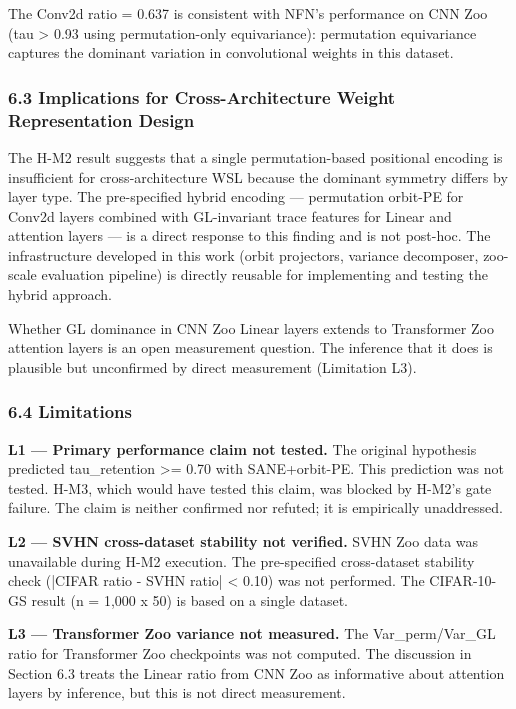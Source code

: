 The Conv2d ratio = 0.637 is consistent with NFN's performance on CNN Zoo (tau > 0.93 using permutation-only equivariance): permutation equivariance captures the dominant variation in convolutional weights in this dataset.

\subsubsection{6.3 Implications for Cross-Architecture Weight Representation Design}

The H-M2 result suggests that a single permutation-based positional encoding is insufficient for cross-architecture WSL because the dominant symmetry differs by layer type. The pre-specified hybrid encoding — permutation orbit-PE for Conv2d layers combined with GL-invariant trace features for Linear and attention layers — is a direct response to this finding and is not post-hoc. The infrastructure developed in this work (orbit projectors, variance decomposer, zoo-scale evaluation pipeline) is directly reusable for implementing and testing the hybrid approach.

Whether GL dominance in CNN Zoo Linear layers extends to Transformer Zoo attention layers is an open measurement question. The inference that it does is plausible but unconfirmed by direct measurement (Limitation L3).

\subsubsection{6.4 Limitations}

\textbf{L1 — Primary performance claim not tested.} The original hypothesis predicted tau_retention >= 0.70 with SANE+orbit-PE. This prediction was not tested. H-M3, which would have tested this claim, was blocked by H-M2's gate failure. The claim is neither confirmed nor refuted; it is empirically unaddressed.

\textbf{L2 — SVHN cross-dataset stability not verified.} SVHN Zoo data was unavailable during H-M2 execution. The pre-specified cross-dataset stability check (|CIFAR ratio - SVHN ratio| < 0.10) was not performed. The CIFAR-10-GS result (n = 1,000 x 50) is based on a single dataset.

\textbf{L3 — Transformer Zoo variance not measured.} The Var_perm/Var_GL ratio for Transformer Zoo checkpoints was not computed. The discussion in Section 6.3 treats the Linear ratio from CNN Zoo as informative about attention layers by inference, but this is not direct measurement.

